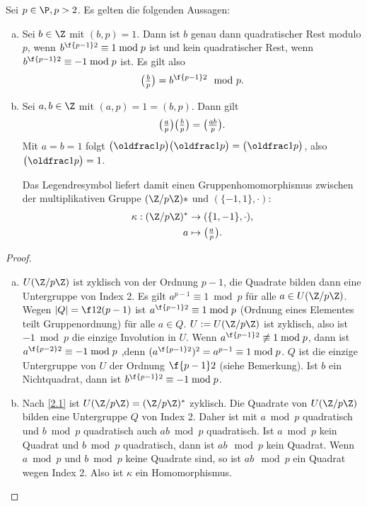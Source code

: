 \begin{lem} \label{2.14}
	Sei $p \in \P, p > 2$.
	Es gelten die folgenden Aussagen:
	\begin{enumerate}[a)]
		\item
			Sei $b \in \Z$ mit $(b, p) = 1$.
			Dann ist $b$ genau dann quadratischer Rest modulo $p$, wenn $b^{\f {p-1}2} \equiv 1 \bmod p$
			ist und kein quadratischer Rest, wenn $b^{\f {p-1}2} \equiv -1 \bmod p$	ist.
			Es gilt also
			\[
				\legsym bp = b^{\f {p-1}2} \mod p.
			\]
		\item
			Sei $a, b \in \Z$ mit $(a,p) = 1 = (b, p)$.
			Dann gilt
			\[
				\legsym ap \legsym bp = \legsym {ab}p.
			\]
			Mit $a = b = 1$ folgt $\legsym 1p \legsym 1p = \legsym 1p$, also $\legsym 1p = 1$.

			Das Legendresymbol liefert damit einen Gruppenhomomorphismus zwischen der multiplikativen Gruppe $(\Z / p\Z)*$ und $(\{-1,1\}, \cdot)$:
			\begin{align*}
				\kappa: (\Z / p\Z)^* &\to (\{1,-1\}, \cdot), \\
				a &\mapsto \legsym ap.
			\end{align*}
	\end{enumerate}
	\begin{proof}
		\begin{enumerate}[a)]
			\item
				$U(\Z / p\Z)$ ist zyklisch von der Ordnung $p - 1$, die Quadrate bilden dann eine Untergruppe von Index 2.
				Es gilt $a^{p-1} \equiv 1 \bmod p$ für alle $a \in U(\Z / p\Z)$.
				Wegen $|Q| = \f 12 (p-1)$ ist $a^{\f {p-1}2} \equiv 1 \bmod p$ (Ordnung eines Elementes teilt Gruppenordnung) für alle $a \in Q$.
				$U := U(\Z / p \Z)$ ist zyklisch, also ist $-1 \bmod p$ die einzige Involution in $U$.
				Wenn $a^{\f{p-1}2} \not\equiv 1 \bmod p$, dann ist $a^{\f{p-2}2} \equiv -1 \bmod p$ ,denn $(a^{\f{p-1}2})^2 = a^{p-1} \equiv 1 \bmod p$.
				$Q$ ist die einzige Untergruppe von $U$ der Ordnung $\f{p-1}2$ (siehe Bemerkung).
				Ist $b$ ein Nichtquadrat, dann ist $b^{\f{p-1}2} \equiv -1 \bmod p$.
			\item
				Nach \ref{2.1} ist $U(\Z / p\Z) = (\Z / p\Z)^*$ zyklisch.
				Die Quadrate von $U(\Z / p \Z)$ bilden eine Untergruppe $Q$ von Index 2. \Exercise
				Daher ist mit $a \bmod p$ quadratisch und $b \bmod p$ quadratisch auch $ab \bmod p$ quadratisch.
				Ist $a \bmod p$ kein Quadrat und $b \bmod p$ quadratisch, dann ist $ab \mod p$ kein Quadrat.
				Wenn $a \bmod p$ und $b \bmod p$ keine Quadrate sind, so ist $ab \mod p$ ein Quadrat wegen Index 2.
				Also ist $\kappa$ ein Homomorphismus.
		\end{enumerate}
	\end{proof}
\end{lem}

